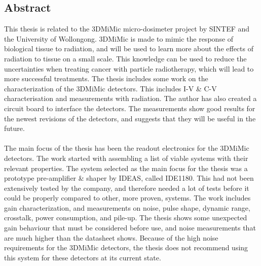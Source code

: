 \documentclass[12pt, a4paper]{report}
\begin{document}
\blankpage	%


\clearpage	%
\begin{center}
\begin{minipage}{\textwidth}
\chapter*{Abstract} %
This thesis is related to the 3DMiMic micro-dosimeter project by SINTEF and the University of Wollongong. 3DMiMic is made to mimic the response of biological tissue to radiation, and will be used to learn more about the effects of radiation to tissue on a small scale. This knowledge can be used to reduce the uncertainties when treating cancer with particle radiotherapy, which will lead to more successful treatments. The thesis includes some work on the characterization of the 3DMiMic detectors. This includes I-V \& C-V characterisation and measurements with radiation. The author has also created a circuit board to interface the detectors. The measurements show good results for the newest revisions of the detectors, and suggests that they will be useful in the future.
\\ \\
The main focus of the thesis has been the readout electronics for the 3DMiMic detectors. The work started with assembling a list of viable systems with their relevant properties. The system selected as the main focus for the thesis was a prototype pre-amplifier \& shaper by IDEAS, called IDE1180. This had not been extensively tested by the company, and therefore needed a lot of tests before it could be properly compared to other, more proven, systems. The work includes gain characterization, and measurements on noise, pulse shape, dynamic range, crosstalk, power consumption, and pile-up. The thesis shows some unexpected gain behaviour that must be considered before use, and noise measurements that are much higher than the datasheet shows. Because of the high noise requirements for the 3DMiMic detectors, the thesis does not recommend using this system for these detectors at its current state. 


\end{minipage}
\end{center}
\clearpage
\end{document}
